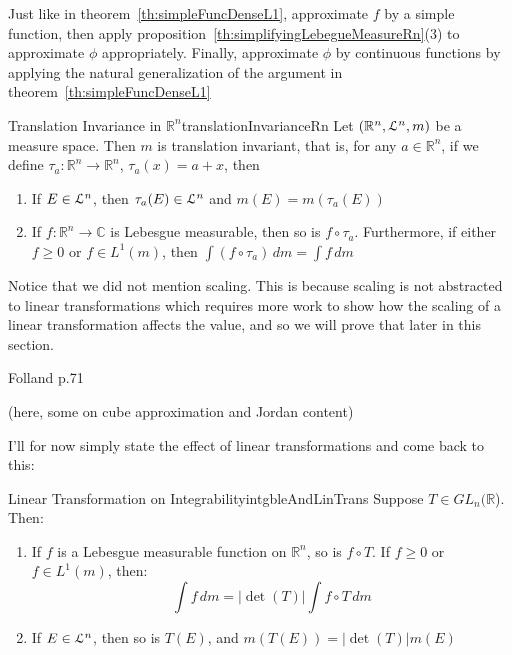 \documentclass[oneside]{book}
\newcommand{\R}{\mathbb{R}}
\renewcommand{\C}{\mathbb{C}}
\newcommand{\EL}{\EuScript{L}}
\newcommand{\rw}{\rightarrow}
\begin{document}
\begin{Proof}
	Just like in theorem~\ref{th:simpleFuncDenseL1}, approximate $f$ by a simple function, then apply
	proposition~\ref{th:simplifyingLebegueMeasureRn}(3) to approximate $\phi$ appropriately. Finally, approximate $\phi$
	by continuous functions by applying the natural generalization of the argument in theorem~\ref{th:simpleFuncDenseL1}
\end{Proof}

\begin{thm}{Translation Invariance in $\R^n$}{translationInvarianceRn}
	Let $(\R^n, \EL^n, m)$ be a measure space. Then $m$ is translation invariant, that is, for any $a \in \R^n$, if we
	define $\tau_a: \R^n \rw \R^n$, $\tau_a(x) = a+x$, then
	\begin{enumerate}
		\item If $E \in \EL^n$, then $\tau_a(E) \in \EL^n$ and $m(E) = m(\tau_a(E))$
		\item If $f: \R^n \rw \C$ is Lebesgue measurable, then so is $f\circ \tau_a$. Furthermore, if either $f \ge 0$
			or $f \in L^1(m)$, then $\int (f\circ \tau_a)\,dm = \int f\,dm$
	\end{enumerate}
\end{thm}

Notice that we did not mention scaling. This is because scaling is not abstracted to linear transformations which
requires more work to show how the scaling of a linear transformation affects the value, and so we will prove that later
in this section.

\begin{Proof}
	Folland p.71
\end{Proof}

(here, some on cube approximation and Jordan content)

I'll for now simply state the effect of linear transformations and come back to this:

\begin{thm}{Linear Transformation on Integrability}{intgbleAndLinTrans}
	Suppose $T \in GL_n(\R$). Then:
	\begin{enumerate}
		\item If $f$ is a Lebesgue measurable function on $\R^n$, so is $f\circ T$. If $f \ge 0$ or $f \in L^1(m)$,
			then:
			\[
				\int f\,dm = |\det(T)|\int f\circ T\,dm
			\]
		\item If $E \in \EL^n$, then so is $T(E)$, and $m(T(E)) = |\det(T)|m(E)$
	\end{enumerate}
\end{thm}
\end{document}
